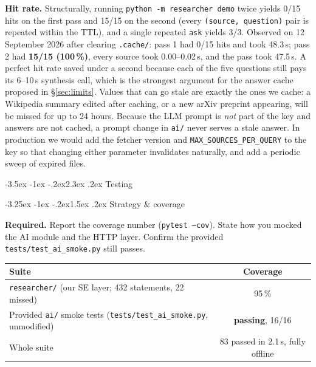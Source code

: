 \documentclass[11pt,a4paper]{article}
\makeatletter
\renewcommand\section{\@startsection{section}{1}{\z@}%
    {-3.5ex \@plus -1ex \@minus -.2ex}{2.3ex \@plus .2ex}%
    {\normalfont\Large\bfseries\color{accent}}}%
\renewcommand\subsection{\@startsection{subsection}{2}{\z@}%
    {-3.25ex \@plus -1ex \@minus -.2ex}{1.5ex \@plus .2ex}%
    {\normalfont\large\bfseries\color{accent}}}%
\makeatother
\begin{document}
\textbf{Hit rate.} Structurally, running \texttt{python -m researcher demo} twice yields 0/15 hits on the first pass and 15/15 on the second (every \texttt{(source, question)} pair is repeated within the TTL), and a single repeated \texttt{ask} yields 3/3. Observed on 12 September 2026 after clearing \texttt{.cache/}: pass 1 had 0/15 hits and took 48.3\,s; pass 2 had \textbf{15/15 (100\,\%)}, every source took 0.00--0.02\,s, and the pass took 47.5\,s. A perfect hit rate saved under a second because each of the five questions still pays its 6--10\,s synthesis call, which is the strongest argument for the answer cache proposed in \S\ref{sec:limits}. Values that can go stale are exactly the ones we cache: a Wikipedia summary edited after caching, or a new arXiv preprint appearing, will be missed for up to 24 hours. Because the LLM prompt is \emph{not} part of the key and answers are not cached, a prompt change in \texttt{ai/} never serves a stale answer. In production we would add the fetcher version and \texttt{MAX\_SOURCES\_PER\_QUERY} to the key so that changing either parameter invalidates naturally, and add a periodic sweep of expired files.

\section{Testing}\label{sec:testing}

\subsection{Strategy \& coverage}

\begin{deliverbox}
\textbf{Required.} Report the coverage number (\texttt{pytest --cov}). State how you mocked the AI module and the HTTP layer. Confirm the provided \texttt{tests/test\_ai\_smoke.py} still passes.
\end{deliverbox}

\begin{center}\small
\begin{tabular}{lc}
\toprule
\textbf{Suite} & \textbf{Coverage} \\
\midrule
\texttt{researcher/} (our SE layer; 432 statements, 22 missed) & 95\,\% \\
Provided \texttt{ai/} smoke tests (\texttt{tests/test\_ai\_smoke.py}, unmodified) & \textcolor{ok}{\textbf{passing}}, 16/16 \\
Whole suite & 83 passed in 2.1\,s, fully offline \\
\bottomrule
\end{tabular}
\end{center}
\end{document}
